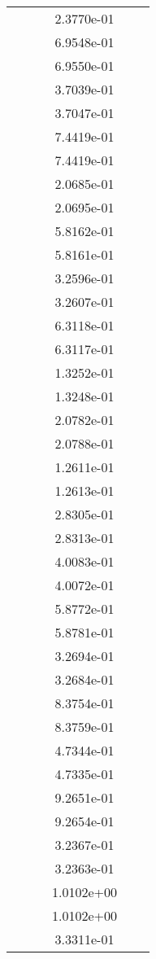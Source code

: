 \begin{xltabular}{\textwidth}{r|rS[table-format=1.3e+2]S[table-format=1.4e+2]S[table-format=1.4e+2]S[table-format=-1.5]}
&  &  & 2.3770e-01 & & \\
&  &  & 6.9548e-01 & & \\
&  &  & 6.9550e-01 & & \\
&  &  & 3.7039e-01 & & \\
&  &  & 3.7047e-01 & & \\
&  &  & 7.4419e-01 & & \\
&  &  & 7.4419e-01 & & \\
&  &  & 2.0685e-01 & & \\
&  &  & 2.0695e-01 & & \\
&  &  & 5.8162e-01 & & \\
&  &  & 5.8161e-01 & & \\
&  &  & 3.2596e-01 & & \\
&  &  & 3.2607e-01 & & \\
&  &  & 6.3118e-01 & & \\
&  &  & 6.3117e-01 & & \\
&  &  & 1.3252e-01 & & \\
&  &  & 1.3248e-01 & & \\
&  &  & 2.0782e-01 & & \\
&  &  & 2.0788e-01 & & \\
&  &  & 1.2611e-01 & & \\
&  &  & 1.2613e-01 & & \\
&  &  & 2.8305e-01 & & \\
&  &  & 2.8313e-01 & & \\
&  &  & 4.0083e-01 & & \\
&  &  & 4.0072e-01 & & \\
&  &  & 5.8772e-01 & & \\
&  &  & 5.8781e-01 & & \\
&  &  & 3.2694e-01 & & \\
&  &  & 3.2684e-01 & & \\
&  &  & 8.3754e-01 & & \\
&  &  & 8.3759e-01 & & \\
&  &  & 4.7344e-01 & & \\
&  &  & 4.7335e-01 & & \\
&  &  & 9.2651e-01 & & \\
&  &  & 9.2654e-01 & & \\
&  &  & 3.2367e-01 & & \\
&  &  & 3.2363e-01 & & \\
&  &  & 1.0102e+00 & & \\
&  &  & 1.0102e+00 & & \\
&  &  & 3.3311e-01 & & \\

\end{xltabular}
